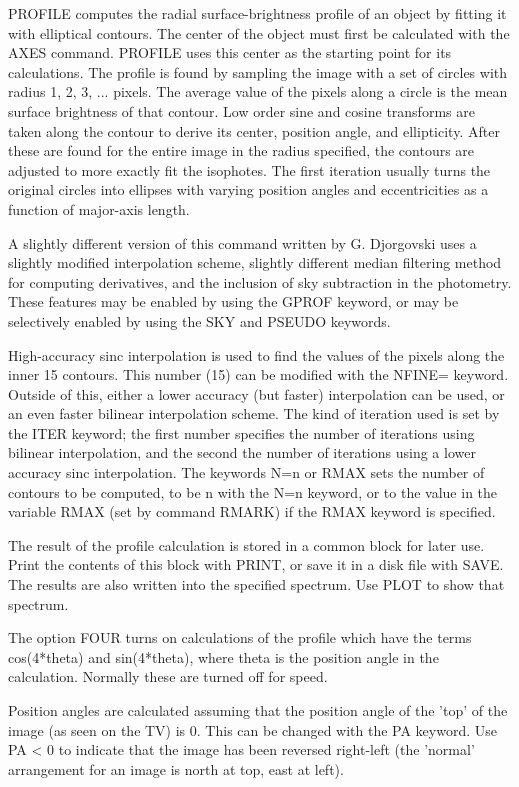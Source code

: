 PROFILE computes the radial surface-brightness profile of an object by
fitting it with elliptical contours. The center of the object must first be
calculated with the AXES command.  PROFILE uses this center as the starting
point for its calculations.  The profile is found by sampling the image
with a set of circles with radius 1, 2, 3, ... pixels.  The average value
of the pixels along a circle is the mean surface brightness of that
contour.  Low order sine and cosine transforms are taken along the contour
to derive its center, position angle, and ellipticity.  After these are
found for the entire image in the radius specified, the contours are
adjusted to more exactly fit the isophotes.  The first iteration usually
turns the original circles into ellipses with varying position angles and
eccentricities as a function of major-axis length.

A slightly different version of this command written by G. Djorgovski uses
a slightly modified interpolation scheme, slightly different median
filtering method for computing derivatives, and the inclusion of sky
subtraction in the photometry.  These features may be enabled by using the
GPROF keyword, or may be selectively enabled by using the SKY and PSEUDO
keywords.

High-accuracy sinc interpolation is used to find the values of the pixels
along the inner 15 contours.  This number (15) can be modified with the
NFINE= keyword. Outside of this, either a lower accuracy (but faster)
interpolation can be used, or an even faster bilinear interpolation scheme.
The kind of iteration used is set by the ITER keyword; the first number
specifies the number of iterations using bilinear interpolation, and the
second the number of iterations using a lower accuracy sinc interpolation.
The keywords N=n or RMAX sets the number of contours to be computed, to be
n with the N=n keyword, or to the value in the variable RMAX (set by
command RMARK) if the RMAX keyword is specified.

The result of the profile calculation is stored in a common block for later
use.  Print the contents of this block with PRINT, or save it in a disk file
with SAVE.  The results are also written into the specified spectrum.  Use
PLOT to show that spectrum.

The option FOUR turns on calculations of the profile which have the terms
cos(4*theta) and sin(4*theta), where theta is the position angle in the
calculation.  Normally these are turned off for speed.

Position angles are calculated assuming that the position angle of the
'top' of the image (as seen on the TV) is 0.  This can be changed with the
PA keyword.  Use PA < 0 to indicate that the image has been reversed
right-left (the 'normal' arrangement for an image is north at top, east at
left).

